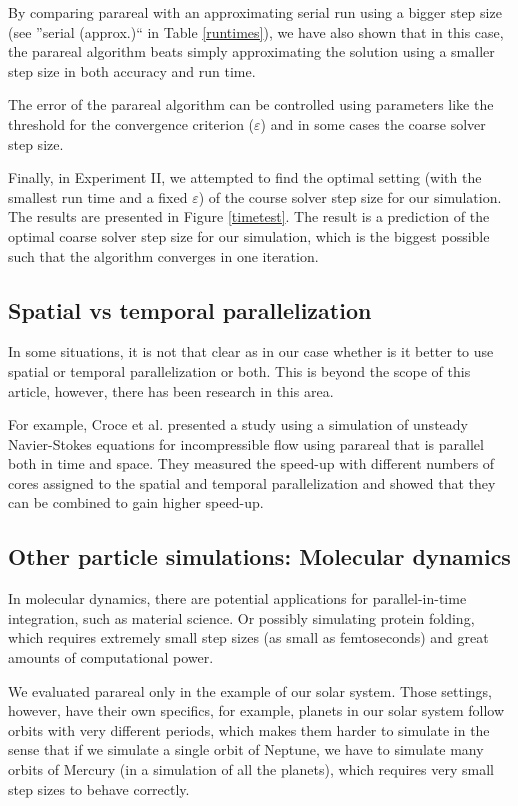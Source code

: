 \documentclass[conference]{IEEEtran}
\begin{document}
By comparing parareal with an approximating serial run using a bigger step size (see ''serial (approx.)`` in Table \ref{runtimes}), we have also shown that in this case, the parareal algorithm beats simply approximating the solution using a smaller step size in both accuracy and run time. 

The error of the parareal algorithm can be controlled using parameters like the threshold for the convergence criterion ($\varepsilon$) and in some cases the coarse solver step size.

Finally, in Experiment II, we attempted to find the optimal setting (with the smallest run time and a fixed $\varepsilon$) of the course solver step size for our simulation. The results are presented in Figure \ref{timetest}. The result is a prediction of the optimal coarse solver step size for our simulation, which is the biggest possible such that the algorithm converges in one iteration.

\subsection{Spatial vs temporal parallelization}

In some situations, it is not that clear as in our case whether is it better to use spatial or temporal parallelization or both. This is beyond the scope of this article, however, there has been research in this area.

For example, Croce et al. presented a study using a simulation of unsteady Navier-Stokes equations for incompressible flow using parareal that is parallel both in time and space. They measured the speed-up with different numbers of cores assigned to the spatial and temporal parallelization and showed that they can be combined to gain higher speed-up. \cite{spacetime}

\subsection{Other particle simulations: Molecular dynamics}
In molecular dynamics, there are potential applications for parallel-in-time integration, such as material science. \cite{moldyn} Or possibly simulating protein folding, which requires extremely small step sizes (as small as femtoseconds) and great amounts of computational power. \cite{protein}

We evaluated parareal only in the example of our solar system. Those settings, however, have their own specifics, for example, planets in our solar system follow orbits with very different periods, which makes them harder to simulate in the sense that if we simulate a single orbit of Neptune, we have to simulate many orbits of Mercury (in a simulation of all the planets), which requires very small step sizes to behave correctly. 
\end{document}
